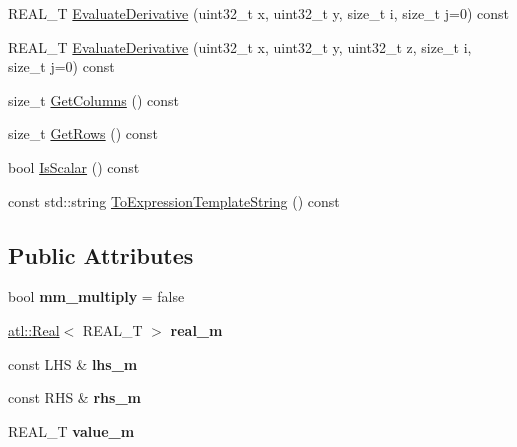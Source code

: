 \begin{DoxyCompactItemize}
\item 
R\+E\+A\+L\+\_\+\+T \hyperlink{structatl_1_1_multiply_ad4723c06544039782a1787184f442e08}{Evaluate\+Derivative} (uint32\+\_\+t x, uint32\+\_\+t y, size\+\_\+t i, size\+\_\+t j=0) const 
\item 
R\+E\+A\+L\+\_\+\+T \hyperlink{structatl_1_1_multiply_ad96c2a68a427fb698c6a415a37fbec2b}{Evaluate\+Derivative} (uint32\+\_\+t x, uint32\+\_\+t y, uint32\+\_\+t z, size\+\_\+t i, size\+\_\+t j=0) const 
\item 
size\+\_\+t \hyperlink{structatl_1_1_multiply_ad0be7a6012b64cd7d0991580e92d63cb}{Get\+Columns} () const 
\item 
size\+\_\+t \hyperlink{structatl_1_1_multiply_a38339891d6ef8ee51ad41376f3dcc222}{Get\+Rows} () const 
\item 
bool \hyperlink{structatl_1_1_multiply_ab7b229dc85f278cd1e734d818b2cfe82}{Is\+Scalar} () const 
\item 
const std\+::string \hyperlink{structatl_1_1_multiply_a7af1cf8911863ad6b83ccba63fa7df52}{To\+Expression\+Template\+String} () const 
\end{DoxyCompactItemize}
\subsection*{Public Attributes}
\begin{DoxyCompactItemize}
\item 
\hypertarget{structatl_1_1_multiply_a545f4e305d26b37ea0c305c7a7477176}{bool {\bfseries mm\+\_\+multiply} = false}\label{structatl_1_1_multiply_a545f4e305d26b37ea0c305c7a7477176}

\item 
\hypertarget{structatl_1_1_multiply_a2cd7b240c36d5fd720efaadaeaf395ea}{\hyperlink{structatl_1_1_real}{atl\+::\+Real}$<$ R\+E\+A\+L\+\_\+\+T $>$ {\bfseries real\+\_\+m}}\label{structatl_1_1_multiply_a2cd7b240c36d5fd720efaadaeaf395ea}

\item 
\hypertarget{structatl_1_1_multiply_a7f974ac48df77cb13ae0a32421c74224}{const L\+H\+S \& {\bfseries lhs\+\_\+m}}\label{structatl_1_1_multiply_a7f974ac48df77cb13ae0a32421c74224}

\item 
\hypertarget{structatl_1_1_multiply_a42844c51219f21e9f376e03f60bc42b1}{const R\+H\+S \& {\bfseries rhs\+\_\+m}}\label{structatl_1_1_multiply_a42844c51219f21e9f376e03f60bc42b1}

\item 
\hypertarget{structatl_1_1_multiply_a1a4a982e56c168c37ae3e79975f9edec}{R\+E\+A\+L\+\_\+\+T {\bfseries value\+\_\+m}}\label{structatl_1_1_multiply_a1a4a982e56c168c37ae3e79975f9edec}

\end{DoxyCompactItemize}


